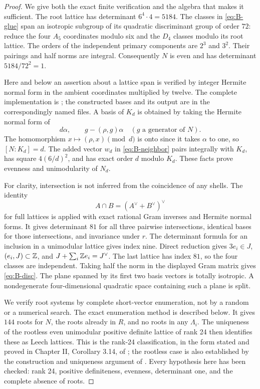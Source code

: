 \begin{proof}
We give both the exact finite verification and the algebra that makes
it sufficient. The root lattice has determinant \(6^4\cdot4=5184\).
The classes in \eqref{eq:B-glue} span an isotropic subgroup of its
quadratic discriminant group of order \(72\): reduce the four
\(A_5\) coordinates modulo six and the \(D_4\) classes modulo its
root lattice. The orders of the independent primary components are
\(2^3\) and \(3^2\). Their pairings and half norms are integral.
Consequently \(N\) is even and has determinant \(5184/72^2=1\).

Here and below an assertion about a lattice span is verified by integer
Hermite normal form in the ambient coordinates multiplied by twelve.
The complete implementation is ;
the constructed bases and its output are in the correspondingly named
 files. A basis of \(K_d\) is obtained by taking
the Hermite normal form of
\[
 d\alpha,\qquad g-(\rho,g)\alpha
 \quad(g\text{ a generator of }N).
\]
The homomorphism \(x\mapsto(\rho,x)\pmod d\) is onto since it takes
\(\alpha\) to one, so \([N:K_d]=d\). The added vector \(w_d\)
in \eqref{eq:B-neighbor} pairs integrally with \(K_d\), has square
\(4(6/d)^2\), and has exact order \(d\) modulo \(K_d\).
These facts prove evenness and unimodularity of \(N_d\).

For clarity, intersection is not inferred from the coincidence of any
shells. The identity
\[
 A\cap B=(A^\vee+B^\vee)^\vee
\]
for full lattices is applied with exact rational Gram inverses and
Hermite normal forms. It gives determinant \(81\) for all three pairwise
intersections, identical bases for those intersections, and invariance
under \(r\). The determinant formula for an inclusion in a unimodular
lattice gives index nine. Direct reduction gives \(3e_i\in J\),
\((e_i,J)\subset\mathbb Z\), and
\(J+\sum_i\mathbb Z e_i=J^\vee\). The last lattice has index \(81\), so the
four classes are independent. Taking half the norm in the displayed
Gram matrix gives \eqref{eq:B-disc}. The plane spanned by its first two
basis vectors is totally isotropic. A nondegenerate four-dimensional
quadratic space containing such a plane is split.

We verify root systems by complete short-vector enumeration, not by a
random or a numerical search. The exact enumeration method is described
below. It gives \(144\) roots for \(N\), the roots already in \(R\),
and no roots in any \(\Lambda_i\). The uniqueness of the rootless even
unimodular positive definite lattice of rank 24 then identifies these
as Leech lattices. This is the rank-24 classification, in the form
stated and proved in Chapter II, Corollary 3.14, of
\citet{B_ChenevierLannes2019}; the rootless case is also established
by the construction and uniqueness argument of \citet{B_Borcherds1985}.
Every hypothesis here has been checked: rank 24, positive definiteness,
evenness, determinant one, and the complete absence of roots.
\end{proof}


